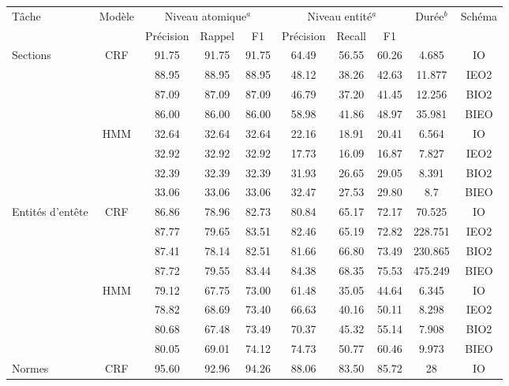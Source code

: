 \begin{table}[h]
\scriptsize
\begin{center}
\begin{tabular}{p{0.9cm}|c|cccccccc}
\hline \noalign{\smallskip}
Tâche & Modèle & \multicolumn{3}{c}{Niveau atomique$^a$} & \multicolumn{3}{c}{Niveau entité$^a$} & \multirow{2}{*}{Durée$^b$} & Schéma \\
 & & Précision & Rappel & F1 &  Précision & Recall & F1 &  & \\ \hline %
\multirow{8}{*}{Sections}  & \multirow{4}{*}{CRF} & 91.75 & 91.75 & 91.75 & 64.49 & 56.55 & 60.26 &  4.685  & IO \\
&  & 88.95 & 88.95 & 88.95 & 48.12 & 38.26 & 42.63  & 11.877 & IEO2 \\
&  & 87.09 & 87.09 & 87.09 & 46.79 & 37.20 & 41.45 & 12.256 & BIO2 \\
 &  & 86.00 & 86.00 & 86.00 & 58.98 & 41.86 & 48.97  & 35.981 & BIEO \\ \cline{2-10}
& \multirow{4}{*}{HMM} & 32.64 & 32.64 & 32.64 & 22.16 & 18.91 & 20.41 & 6.564 & IO \\
&  & 32.92 & 32.92 & 32.92 & 17.73 & 16.09 & 16.87  &   7.827  & IEO2 \\
 &  & 32.39 & 32.39 & 32.39 & 31.93 & 26.65 & 29.05 & 8.391 & BIO2 \\
  &  & 33.06 & 33.06 & 33.06 & 32.47 & 27.53 & 29.80 & 8.7 & BIEO \\ \hline %
\multirow{8}{=}{Entités d'entête}  & \multirow{4}{*}{CRF} & 86.86 & 78.96 & 82.73 & 80.84 & 65.17 & 72.17  & 70.525 & IO \\%
 &  & 87.77 & 79.65 & 83.51 & 82.46 & 65.19 & 72.82  & 228.751 & IEO2 \\
 &  & 87.41 & 78.14 & 82.51 & 81.66 & 66.80 & 73.49 & 230.865 & BIO2 \\
 &  & 87.72 & 79.55 & 83.44 & 84.38 & 68.35 & 75.53 &  475.249 & BIEO \\ \cline{2-10}
  & \multirow{4}{*}{HMM} & 79.12 & 67.75 & 73.00 & 61.48 & 35.05 & 44.64 & 6.345 & IO \\
  &  & 78.82 & 68.69 & 73.40 & 66.63 & 40.16 & 50.11& 8.298 & IEO2 \\ 
  &  & 80.68 & 67.48 & 73.49 & 70.37 & 45.32 & 55.14 & 7.908 & BIO2 \\
 &  & 80.05 & 69.01 & 74.12 & 74.73 & 50.77 & 60.46 & 9.973 & BIEO \\ \hline
\multirow{8}{*}{Normes}  & \multirow{4}{*}{CRF} & 95.60 & 92.96 & 94.26 & 88.06 & 83.50 & 85.72 & 28 & IO \\%

\end{tabular}
\end{center}
\end{table}
